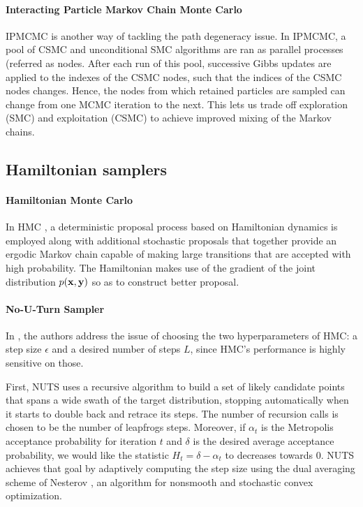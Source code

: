 \paragraph{Interacting Particle Markov Chain Monte Carlo}
\gls{IPMCMC} \cite{Rainforth:2016wq} is another way of tackling the path degeneracy issue.
In \gls{IPMCMC}, a pool of \gls{CSMC} and unconditional \gls{SMC} algorithms are ran as parallel processes (referred as nodes. After each run of this pool, successive Gibbs updates are applied to the indexes of the \gls{CSMC} nodes, such that the indices of the \gls{CSMC} nodes changes. Hence, the nodes from which retained particles are sampled can change from one \gls{MCMC} iteration to the next. This lets us trade off exploration (\gls{SMC}) and exploitation (\gls{CSMC}) to achieve improved mixing of the Markov chains.

\subsection{Hamiltonian samplers}

\paragraph{Hamiltonian Monte Carlo}
In \gls{HMC} \cite{HMC,Neal:2012uu}, a deterministic proposal process based on Hamiltonian dynamics is employed along with additional stochastic proposals that together provide an ergodic Markov chain capable of making large transitions that are accepted with high probability. The Hamiltonian makes use of the gradient of the joint distribution $p(\boldsymbol{\mathbf{x}}, \boldsymbol{\mathbf{y}})$ so as to construct better proposal.

\paragraph{No-U-Turn Sampler}
In \cite{NUTS}, the authors address the issue of choosing the two hyperparameters of \gls{HMC}: a step size $\epsilon$ and a desired number of steps $L$, since \gls{HMC}'s performance is highly sensitive on those.

First, \gls{NUTS} uses a recursive algorithm to build a set of likely candidate points that spans a wide swath of the target distribution, stopping automatically when it starts to double back and retrace its steps. The number of recursion calls is chosen to be the number of leapfrogs steps.
Moreover, if $\alpha_t$ is the Metropolis acceptance probability for iteration $t$ and $\delta$ is the desired average acceptance probability, we would like the statistic $H_t = \delta - \alpha_t$ to decreases towards $0$.
\gls{NUTS} achieves that goal by adaptively computing the step size using the dual averaging scheme of Nesterov \cite{Nesterov2009}, an algorithm for nonsmooth and stochastic convex optimization.


